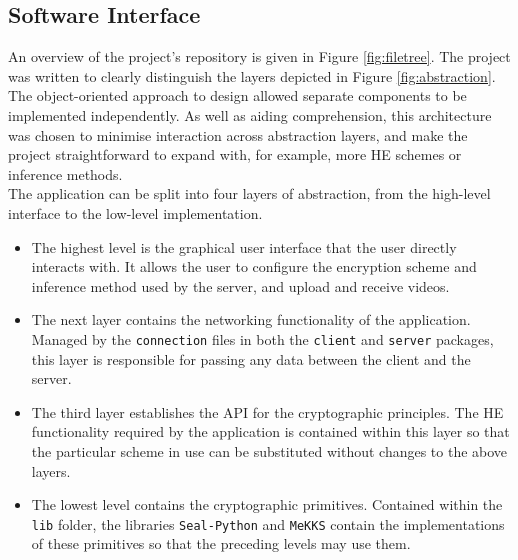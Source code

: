\subsection{Software Interface}
\setlength{\leftskip}{0.5cm}
\indent \indent
An overview of the project's repository is given in Figure \ref{fig:filetree}. The project was written to clearly distinguish the layers depicted in Figure \ref{fig:abstraction}. The object-oriented approach to design allowed separate components to be implemented independently. As well as aiding comprehension, this architecture was chosen to minimise interaction across abstraction layers, and make the project straightforward to expand with, for example, more HE schemes or inference methods.
\smallskip \\ \indent
The application can be split into four layers of abstraction, from the high-level interface to the low-level implementation.
\begin{itemize}
    \item The highest level is the graphical user interface that the user directly interacts with. It allows the user to configure the encryption scheme and inference method used by the server, and upload and receive videos.
    \item The next layer contains the networking functionality of the application. Managed by the \texttt{connection} files in both the \texttt{client} and \texttt{server} packages, this layer is responsible for passing any data between the client and the server.
    \item The third layer establishes the API for the cryptographic principles. The HE functionality required by the application is contained within this layer so that the particular scheme in use can be substituted without changes to the above layers.
    \item The lowest level contains the cryptographic primitives. Contained within the \texttt{lib} folder, the libraries \texttt{Seal-Python} and \texttt{MeKKS} contain the implementations of these primitives so that the preceding levels may use them.
\end{itemize}

